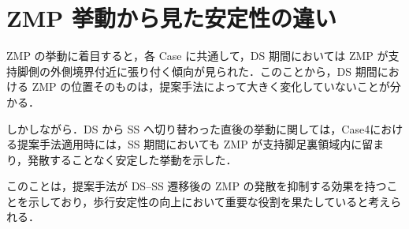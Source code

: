 \section{ZMP 挙動から見た安定性の違い}
\label{sec:discussion_zmp}

ZMP の挙動に着目すると，各 Case に共通して，DS 期間においては ZMP が支持脚側の外側境界付近に張り付く傾向が見られた．このことから，DS 期間における ZMP の位置そのものは，提案手法によって大きく変化していないことが分かる．

しかしながら．DS から SS へ切り替わった直後の挙動に関しては，Case4における提案手法適用時には，SS 期間においても ZMP が支持脚足裏領域内に留まり，発散することなく安定した挙動を示した．

このことは，提案手法が DS--SS 遷移後の ZMP の発散を抑制する効果を持つことを示しており，歩行安定性の向上において重要な役割を果たしていると考えられる．
